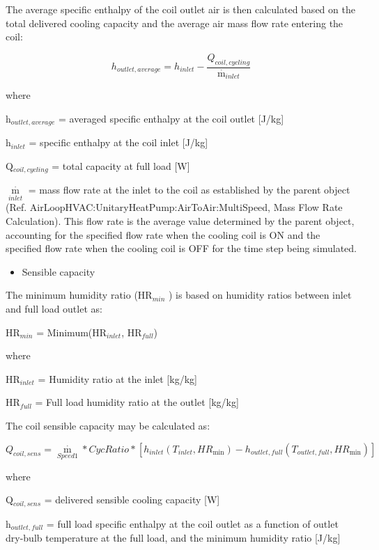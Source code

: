 The average specific enthalpy of the coil outlet air is then calculated based on the total delivered cooling capacity and the average air mass flow rate entering the coil:

\begin{equation}
  h_{outlet,average} = h_{inlet} -  \frac{Q_{coil,cycling}}{{\mathop m\limits^\cdot}_{inlet}}
\end{equation}

where

h\(_{outlet,average}\) = averaged specific enthalpy at the coil outlet {[}J/kg{]}

h\(_{inlet}\) = specific enthalpy at the coil inlet {[}J/kg{]}

Q\(_{coil,cycling}\) = total capacity at full load {[}W{]}

\({\mathop m\limits^\cdot_{inlet}}\) = mass flow rate at the inlet to the coil as established by the parent object (Ref. AirLoopHVAC:UnitaryHeatPump:AirToAir:MultiSpeed, Mass Flow Rate Calculation). This flow rate is the average value determined by the parent object, accounting for the specified flow rate when the cooling coil is ON and the specified flow rate when the cooling coil is OFF for the time step being simulated.

\begin{itemize}
  \item Sensible capacity
\end{itemize}

The minimum humidity ratio (HR\(_{min}\) ) is based on humidity ratios between inlet and full load outlet as:

HR\(_{min}\) = Minimum(HR\(_{inlet}\), HR\(_{full}\))

where

HR\(_{inlet}\) = Humidity ratio at the inlet {[}kg/kg{]}

HR\(_{full}\) = Full load humidity ratio at the outlet {[}kg/kg{]}

The coil sensible capacity may be calculated as:

\begin{equation}
  Q_{coil,sens} = {\mathop m\limits^\cdot_{Speed1}}*CycRatio*[{h_{inlet}}({T_{inlet}},H{R_{\min }}) - {h_{outlet,full}}({T_{outlet,full}},H{R_{\min }})]
\end{equation}

where

Q\(_{coil,sens}\) = delivered sensible cooling capacity {[}W{]}

h\(_{outlet,full}\) = full load specific enthalpy at the coil outlet as a function of outlet dry-bulb temperature at the full load, and the minimum humidity ratio {[}J/kg{]}

